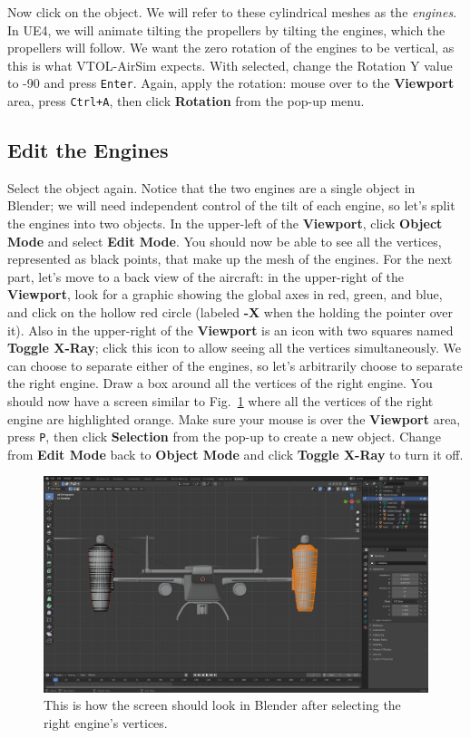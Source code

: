 Now click on the  object. We will refer to these cylindrical meshes as the \textit{engines}. In UE4, we will animate tilting the propellers by tilting the engines, which the propellers will follow. We want the zero rotation of the engines to be vertical, as this is what VTOL-AirSim expects. With  selected, change the Rotation Y value to -90 and press \texttt{Enter}. Again, apply the rotation: mouse over to the \textbf{Viewport} area, press \texttt{Ctrl+A}, then click \textbf{Rotation} from the pop-up menu.

\subsection{Edit the Engines}
Select the  object again. Notice that the two engines are a single object in Blender; we will need independent control of the tilt of each engine, so let's split the engines into two objects. In the upper-left of the \textbf{Viewport}, click \textbf{Object Mode} and select \textbf{Edit Mode}. You should now be able to see all the vertices, represented as black points, that make up the mesh of the engines. For the next part, let's move to a back view of the aircraft: in the upper-right of the \textbf{Viewport}, look for a graphic showing the global axes in red, green, and blue, and click on the hollow red circle (labeled \textbf{-X} when the holding the pointer over it). Also in the upper-right of the \textbf{Viewport} is an icon with two squares named \textbf{Toggle X-Ray}; click this icon to allow seeing all the vertices simultaneously. We can choose to separate either of the engines, so let's arbitrarily choose to separate the right engine. Draw a box around all the vertices of the right engine. You should now have a screen similar to Fig.~\ref{fig:blender_vertices} where all the vertices of the right engine are highlighted orange. Make sure your mouse is over the \textbf{Viewport} area, press \texttt{P}, then click \textbf{Selection} from the pop-up to create a new object. Change from \textbf{Edit Mode} back to \textbf{Object Mode} and click \textbf{Toggle X-Ray} to turn it off.

\begin{figure}[t]
    \centering
    \includegraphics[width=\textwidth]{figures/blender_highlight_vertices}
    \caption[Blender screen of highlighted vertices]{
        This is how the screen should look in Blender after selecting the right engine's vertices.}%
    \label{fig:blender_vertices}
\end{figure}

